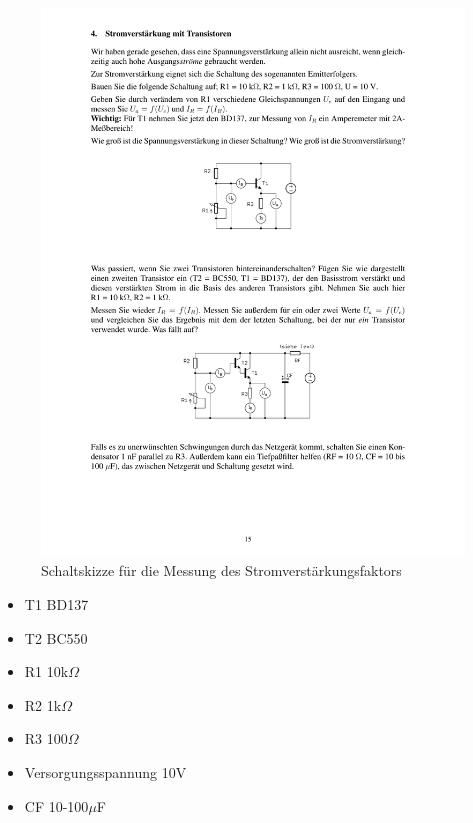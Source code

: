\documentclass[12pt,a4paper]{article}
\begin{document}
\begin{figure}[H] 
  \centering
    \includegraphics[trim = 10mm 165mm 10mm 75mm, clip, scale = 1]{ep3_14[Page15].pdf}
  	\caption[Schaltskizze für die Messung des Stromverstärkungsfaktors]{Schaltskizze für die Messung des Stromverstärkungsfaktors\footnotemark}
  \label{fig:4}
\end{figure}


\begin{itemize}
\item	T1 BD137

\item	T2 BC550

\item	R1 10k$\Omega$

\item	R2 1k$\Omega$

\item	R3 100$\Omega$

\item	Versorgungsspannung 10V

\item	CF 10-100$\mu$F

\end{itemize}
\end{document}
